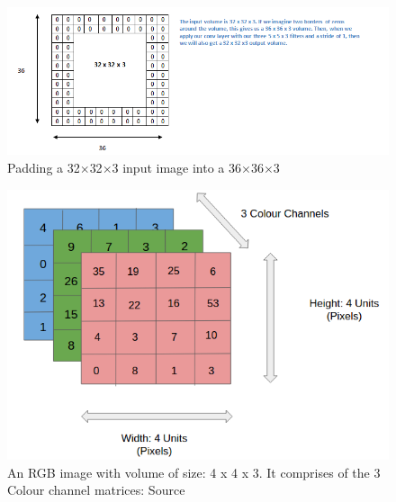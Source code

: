 \documentclass[master]{thesis-uestc}
\begin{document}
\begin{figure}[ht]
\includegraphics[width=7in]{pic/padding.png}
\caption{Padding a 32$\times$32$\times$3 input image into a 36$\times$36$\times$3}
\label{fig_padding}
\end{figure}

\begin{figure}[ht]
\includegraphics[width=5in]{pic/rgb_image.png}
\caption{An RGB image with volume of size: 4 x 4 x 3. It comprises of the 3 Colour channel matrices: Source \cite{Abhineet}}
\label{rgb_image}
\end{figure}
\end{document}
